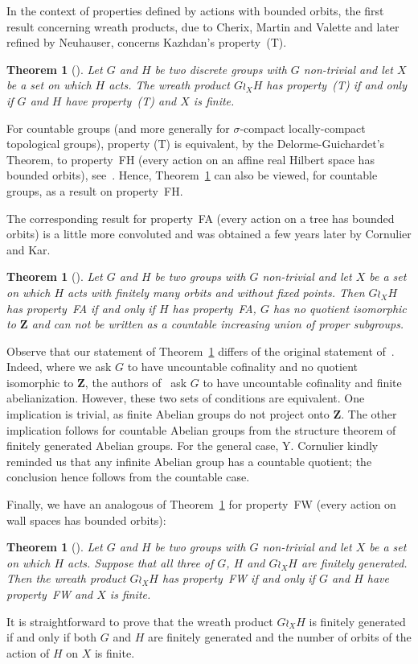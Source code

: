 \documentclass[a4paper]{article}
\newtheorem{thm}[lem]{Theorem}
\theoremstyle{definition}
\newcommand*{\field}[1]{\mathbf{#1}}
\newcommand*{\Z}{\field{Z}}
\newcommand*{\FH}{FH}
\newcommand*{\FW}{FW}
\newcommand*{\FA}{FA}
\begin{document}
In the context of properties defined by actions with bounded orbits, the first result concerning wreath products, due to Cherix, Martin and Valette and later refined by Neuhauser, concerns Kazhdan's property~(T).
%
%
\begin{thm}[\cite{MR2106770,MR2176470}] \label{T:Wreath_prop_T}
Let $G$ and $H$ be two discrete groups with $G$ non-trivial and let $X$ be a set on which $H$ acts.
The wreath product $G \wr_X H$ has property~(T) if and only if $G$ and $H$ have property~(T) and $X$ is finite.
\end{thm}
%
%
For countable groups (and more generally for $\sigma$-compact locally-compact topological groups), property (T) is equivalent, by the Delorme-Guichardet's Theorem, to property~\FH{} (every action on an affine real Hilbert space has bounded orbits), see~\cite[Thm. 2.12.4]{MR2415834}.
Hence, Theorem~\ref{T:Wreath_prop_T} can also be viewed, for countable groups, as a result on property~\FH.

The corresponding result for property~\FA{} (every action on a tree has bounded orbits) is a little more convoluted and was obtained a few years later by Cornulier and Kar.
%
%
\begin{thm}[\cite{MR2764930}]\label{Thm:FACK}
Let $G$ and $H$ be two groups with $G$ non-trivial and let $X$ be a set on which $H$ acts with finitely many orbits and without fixed points.
Then $G\wr_XH$ has property~\FA{} if and only if $H$ has property~\FA, $G$ has no quotient isomorphic to $\Z$ and can not be written as a countable increasing union of proper subgroups.
\end{thm}
%
%
Observe that our statement of Theorem~\ref{Thm:FACK} differs of the original statement of~\cite{MR2764930}.
Indeed, where we ask $G$ to have uncountable cofinality and no quotient isomorphic to $\Z$, the authors of~\cite{MR2764930} ask $G$ to have uncountable cofinality and finite abelianization.
However, these two sets of conditions are equivalent.
One implication is trivial, as finite Abelian groups do not project onto $\Z$. The other implication follows for countable Abelian groups from the structure theorem of finitely generated Abelian groups.
For the general case, Y. Cornulier kindly reminded us that any infinite Abelian group has a countable quotient; the conclusion hence follows from the countable case.

Finally, we have an analogous of Theorem~\ref{T:Wreath_prop_T} for property~\FW{} (every action on wall spaces has bounded orbits):
%
%
\begin{thm}[\cite{Cornulier2013,LS2020}]\label{Thm:PropFW}
Let $G$ and $H$ be two groups with $G$ non-trivial and let $X$ be a set on which $H$ acts.
Suppose that all three of $G$, $H$ and $G\wr_XH$ are finitely generated. Then the wreath product $G \wr_X H$ has property~\FW{} if and only if $G$ and $H$ have property~\FW{} and $X$ is finite.
\end{thm}
%
%
It is straightforward to prove that the wreath product $G \wr_X H$ is finitely generated if and only if both $G$ and $H$ are finitely generated and the number of orbits of the action of $H$ on $X$ is finite.
\end{document}
